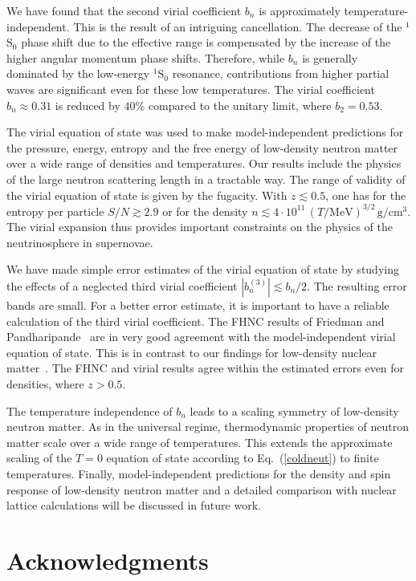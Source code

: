 \documentclass[aps,prc,twocolumn,showpacs,showkeys,amsmath,amssymb]{revtex4}
\newcommand{\gcq}{\, \text{g}/\text{cm}^{3}}
\begin{document}
We have found that the second virial coefficient $b_n$ is approximately 
temperature-independent. This is the result of an intriguing cancellation.
The decrease of the $^1$S$_0$ phase shift due to the effective range is 
compensated by the increase of the higher angular momentum phase shifts. 
Therefore, while $b_n$ is generally dominated by the low-energy $^1$S$_0$ 
resonance, contributions from higher partial waves are significant even
for these low temperatures. The virial coefficient $b_n \approx 0.31$ is
reduced by $40 \%$ compared to the unitary limit, where $b_2 = 0.53$.

The virial equation of state was used to make model-independent predictions 
for the pressure, energy, entropy and the free energy of low-density neutron 
matter over a wide range of densities and temperatures. Our results include 
the physics of the large neutron scattering length in a tractable way.
The range of validity of the virial equation of state is given by the
fugacity. With $z \lesssim 0.5$, one has for the entropy per particle
$S/N \gtrsim 2.9$ or for the density $n \lesssim 4 \cdot 10^{11} \, 
(T/\text{MeV})^{3/2} \gcq$. The virial expansion thus provides important 
constraints on the physics of the neutrinosphere in supernovae. 

We have made simple error estimates of the virial equation of state by 
studying the effects of a neglected third virial coefficient $|b_n^{(3)}|
\lesssim b_n/2$. The resulting error bands are small. For a better error 
estimate, it is important to have a reliable calculation of the third 
virial coefficient. The FHNC results of Friedman and Pandharipande~\cite{FP} 
are in very good agreement with the model-independent virial equation of 
state. This is in contrast to our findings for low-density nuclear 
matter~\cite{vEOSnuc}. The FHNC and virial results agree within the
estimated errors even for densities, where $z > 0.5$.

The temperature independence of $b_n$ leads to a scaling symmetry of
low-density neutron matter. As in the universal regime, thermodynamic 
properties of neutron matter scale over a wide range of temperatures.
This extends the approximate scaling of the $T=0$ equation of 
state according to Eq.~(\ref{coldneut}) to finite temperatures. 
Finally, model-independent predictions for the density and spin response 
of low-density neutron matter and a detailed comparison with nuclear 
lattice calculations will be discussed in future work.

\section*{Acknowledgments}
\end{document}
